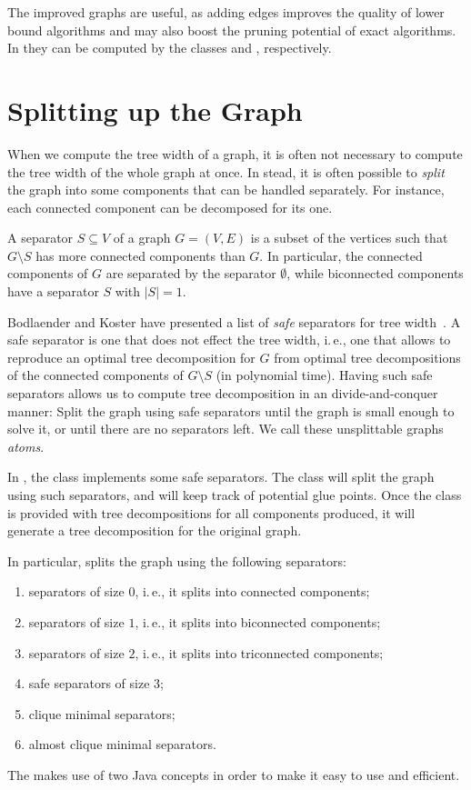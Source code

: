 \documentclass[a4paper, ukenglish, twoside, openright]{jdrasilmanual}
\begin{document}
The improved graphs are useful, as adding edges improves the quality
of lower bound algorithms and may also boost the pruning potential of
exact algorithms. In \Jdrasil{} they can be computed by the classes
 and , respectively. 

\chapter{Splitting up the Graph}
When we compute the tree width of a graph, it is often not necessary
to compute the tree width of the whole graph at once. In stead, it is
often possible to \emph{split} the graph into some components that can
be handled separately. For instance, each connected component can be
decomposed for its one.

A separator $S\subseteq V$ of a graph $G=(V,E)$ is a subset of the
vertices such that $G\setminus S$ has more connected components
than $G$. In particular, the connected components of $G$ are separated
by the separator $\emptyset$, while biconnected components have a
separator $S$ with $|S|=1$.

Bodlaender and Koster have presented a list of \emph{safe} separators
for tree width~\cite{BodlaenderK2006}. A safe separator is one that
does not effect the tree width, i.\,e., one that allows to reproduce
an optimal tree decomposition for $G$ from optimal tree decompositions
of the connected components of $G\setminus S$ (in polynomial
time). Having such safe separators allows us to compute tree
decomposition in an divide-and-conquer manner: Split the graph using
safe separators until the graph is small enough to solve it, or until
there are no separators left. We call these unsplittable graphs \emph{atoms}.

In \Jdrasil, the class  implements some safe
separators. The class will split the graph using such separators, and
will keep track of potential glue points. Once the class is provided
with tree decompositions for all components produced, it will generate
a tree decomposition for the original graph.

In particular,  splits the graph using the
following separators:
\begin{enumerate}
  \item separators of size $0$, i.\,e., it splits into connected
    components;
  \item separators of size $1$, i.\,e., it splits into biconnected
    components;
  \item separators of size $2$, i.\,e., it splits into triconnected
    components;
  \item safe separators of size $3$;
  \item clique minimal separators;
  \item almost clique minimal separators.
\end{enumerate}
The  makes use of two Java concepts in order to
make it easy to use and efficient.
\end{document}
